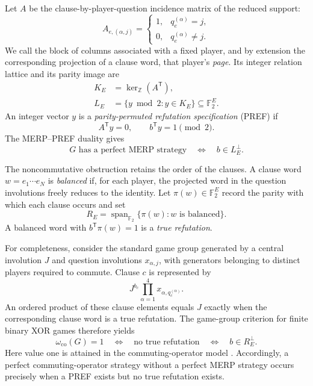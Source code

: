 \documentclass[11pt]{article}
\theoremstyle{definition}
\theoremstyle{remark}
\numberwithin{equation}{section}
\begin{document}
Let \(A\) be the clause-by-player-question incidence matrix of the reduced
support:
\[
  A_{e,(\alpha,j)}
  =
  \begin{cases}
    1,&q_e^{(\alpha)}=j,\\
    0,&q_e^{(\alpha)}\neq j.
  \end{cases}
\]
We call the block of columns associated with a fixed player, and by extension
the corresponding projection of a clause word, that player's \emph{page}.
Its integer relation lattice and its parity image are
\begin{align}
  K_E&=\ker_{\mathbb Z}(A^{\mathsf T}),\\
  L_E&=\{y\bmod2:y\in K_E\}\subseteq\mathbb F_2^E.
  \label{eq:LE-main}
\end{align}
An integer vector \(y\) is a \emph{parity-permuted refutation specification}
(PREF) if
\begin{equation}\label{eq:pref-definition}
  A^{\mathsf T}y=0,
  \qquad
  b^{\mathsf T}y=1\pmod2.
\end{equation}
The MERP--PREF duality gives
\begin{equation}\label{eq:merp-main}
  G\text{ has a perfect MERP strategy}
  \quad\Longleftrightarrow\quad
  b\in L_E^\perp.
\end{equation}

The noncommutative obstruction retains the order of the clauses.  A clause
word \(w=e_1\cdots e_N\) is \emph{balanced} if, for each player, the projected
word in the question involutions freely reduces to the identity.  Let
\(\pi(w)\in\mathbb F_2^E\) record the parity with which each clause occurs and
set
\begin{equation}\label{eq:RE-main}
  R_E=\operatorname{span}_{\mathbb F_2}
  \{\pi(w):w\text{ is balanced}\}.
\end{equation}
A balanced word with \(b^{\mathsf T}\pi(w)=1\) is a \emph{true refutation}.

For completeness, consider the standard game group generated by a central
involution \(J\) and question involutions \(x_{\alpha,j}\), with generators
belonging to distinct players required to commute.  Clause \(c\) is represented by
\[
  J^{b_c}\prod_{\alpha=1}^{4}x_{\alpha,q_c^{(\alpha)}}.
\]
An ordered product of these clause elements equals \(J\) exactly when the
corresponding clause word is a true refutation.  The game-group criterion for
finite binary XOR games therefore yields
\begin{equation}\label{eq:co-main}
  \omega_{\mathrm{co}}(G)=1
  \quad\Longleftrightarrow\quad
  \text{no true refutation}
  \quad\Longleftrightarrow\quad
  b\in R_E^\perp.
\end{equation}
Here value one is attained in the commuting-operator model
\cite{WattsHarrowKanwarNatarajan2019,WattsHelton2023,
WattsHeltonKlep2023}.  Accordingly, a perfect commuting-operator strategy
without a perfect MERP strategy occurs precisely when a PREF exists but no
true refutation exists.
\end{document}
